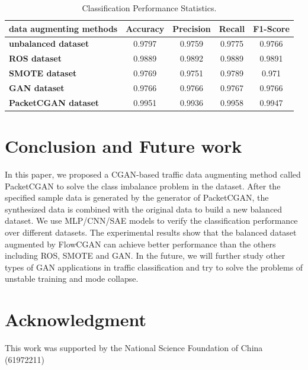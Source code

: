 \documentclass[conference]{IEEEtran}
\begin{document}
\begin{table}[htb]
	\centering
	\fontsize{6.5}{8}
	\caption{Classification Performance Statistics.}\label{table:performance_classifier}
	\begin{tabular}{|l|c|c|c|c|}%
		\hline
		data augmenting methods & Accuracy & Precision & Recall & F1-Score \\
		\hline
		\textbf{unbalanced dataset}  & 0.9797 & 0.9759 & 0.9775 &  0.9766 \\
		\hline
		\textbf{ROS dataset}   & 0.9889 & 0.9892 & 0.9889& 0.9891 \\
		\hline
		\textbf{SMOTE dataset}   & 0.9769 & 0.9751 & 0.9789& 0.971 \\
		\hline
		\textbf{GAN dataset}   & 0.9766 & 0.9766 & 0.9767 & 0.9766 \\
		\hline
		\textbf{PacketCGAN dataset}   & 0.9951 & 0.9936 & 0.9958  & 0.9947 \\
		\hline
	\end{tabular}
\end{table}


\section{Conclusion and Future work}\label{conclusion}
In this paper, we proposed a CGAN-based traffic data augmenting method called PacketCGAN to solve the class imbalance problem in the dataset. After the specified sample data is generated by the generator of PacketCGAN, the synthesized data is combined with the original data to build  a new balanced dataset. We use MLP/CNN/SAE models to verify the classification performance over different datasets. The experimental results show that the balanced dataset augmented by FlowCGAN can achieve better performance than the others including ROS, SMOTE and GAN. In the future, we will further study other types of GAN applications in traffic classification and  try to solve the problems of unstable training and mode collapse.

\section*{Acknowledgment}
This work was supported by the National Science Foundation of China (61972211)




\renewcommand\refname{Reference}


\end{document}

